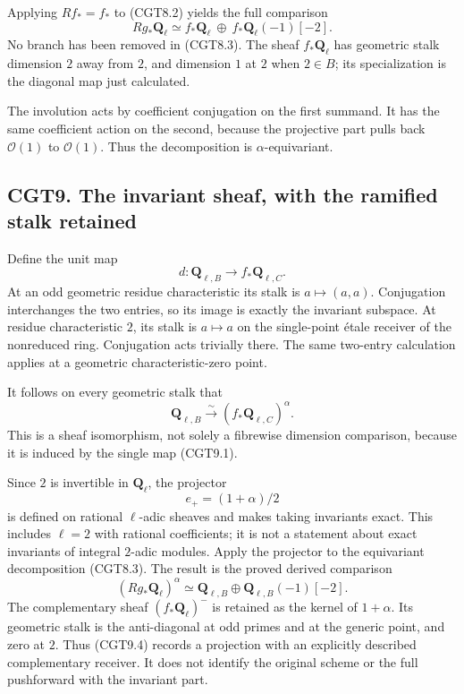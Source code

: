 Applying \(Rf_*=f_*\) to (CGT8.2) yields the full comparison \[
\boxed{Rg_*\mathbf Q_\ell
\simeq f_*\mathbf Q_\ell\ \oplus\
f_*\mathbf Q_\ell(-1)[-2].}
\tag{CGT8.3}
\] No branch has been removed in (CGT8.3). The sheaf
\(f_*\mathbf Q_\ell\) has geometric stalk dimension \(2\) away from
\(2\), and dimension \(1\) at \(2\) when \(2\in B\); its specialization
is the diagonal map just calculated.

The involution acts by coefficient conjugation on the first summand. It
has the same coefficient action on the second, because the projective
part pulls back \(\mathcal O(1)\) to \(\mathcal O(1)\). Thus the
decomposition is \(\alpha\)-equivariant.

\subsection{CGT9. The invariant sheaf, with the ramified stalk
retained}\label{cgt9.-the-invariant-sheaf-with-the-ramified-stalk-retained}

Define the unit map \[
d:\mathbf Q_{\ell,B}\longrightarrow f_*\mathbf Q_{\ell,C}.
\tag{CGT9.1}
\] At an odd geometric residue characteristic its stalk is
\(a\mapsto(a,a)\). Conjugation interchanges the two entries, so its
image is exactly the invariant subspace. At residue characteristic
\(2\), its stalk is \(a\mapsto a\) on the single-point étale receiver of
the nonreduced ring. Conjugation acts trivially there. The same
two-entry calculation applies at a geometric characteristic-zero point.

It follows on every geometric stalk that \[
\boxed{\mathbf Q_{\ell,B}\xrightarrow{\sim}
(f_*\mathbf Q_{\ell,C})^\alpha.}
\tag{CGT9.2}
\] This is a sheaf isomorphism, not solely a fibrewise dimension
comparison, because it is induced by the single map (CGT9.1).

Since \(2\) is invertible in \(\mathbf Q_\ell\), the projector \[
e_+=(1+\alpha)/2
\tag{CGT9.3}
\] is defined on rational \(\ell\)-adic sheaves and makes taking
invariants exact. This includes \(\ell=2\) with rational coefficients;
it is not a statement about exact invariants of integral \(2\)-adic
modules. Apply the projector to the equivariant decomposition (CGT8.3).
The result is the proved derived comparison \[
\boxed{(Rg_*\mathbf Q_\ell)^\alpha
\simeq\mathbf Q_{\ell,B}\oplus
\mathbf Q_{\ell,B}(-1)[-2].}
\tag{CGT9.4}
\] The complementary sheaf \((f_*\mathbf Q_\ell)^-\) is retained as the
kernel of \(1+\alpha\). Its geometric stalk is the anti-diagonal at odd
primes and at the generic point, and zero at \(2\). Thus (CGT9.4)
records a projection with an explicitly described complementary
receiver. It does not identify the original scheme or the full
pushforward with the invariant part.

